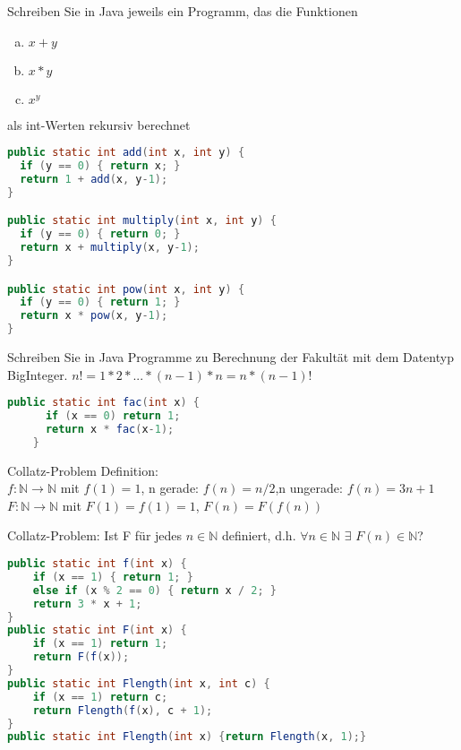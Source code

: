 \begin{card}
	Schreiben Sie in Java jeweils ein Programm, das die Funktionen
	\begin{enumerate}[a)]
	\item $x+y$
	\item $x*y$
	\item $x^y$
	\end{enumerate}
	als int-Werten rekursiv berechnet
	\hr
	\begin{lstlisting}[language=Java]
public static int add(int x, int y) {
  if (y == 0) { return x; }
  return 1 + add(x, y-1);
}

public static int multiply(int x, int y) {
  if (y == 0) { return 0; }
  return x + multiply(x, y-1);
}

public static int pow(int x, int y) {
  if (y == 0) { return 1; }
  return x * pow(x, y-1);
}
	\end{lstlisting}
\end{card}

\begin{card}
	Schreiben Sie in Java Programme zu Berechnung der Fakultät mit dem Datentyp BigInteger.
	\hr
	$n! = 1*2*...*(n-1)*n = n * (n-1)!$
	\begin{lstlisting}[language=Java]
	public static int fac(int x) {
	  if (x == 0) return 1;
	  return x * fac(x-1);
	}
	\end{lstlisting}
\end{card}

\begin{card}
	Collatz-Problem Definition:\\
	$f: \mathbb{N} \rightarrow \mathbb{N}$ mit 
	$f(1) = 1$, n gerade: $f(n) = n / 2$,n ungerade: $f(n) = 3n + 1$\\
	$F: \mathbb{N} \rightarrow \mathbb{N}$ mit $F(1) = f(1)  = 1$, $F(n) = F(f(n))$
	
	Collatz-Problem: Ist F für jedes $n \in \mathbb{N}$  definiert, d.h. $\forall n \in \mathbb{N}$ $\exists$ $F(n) \in \mathbb{N}$?
	\hr
	\begin{lstlisting}[language=Java]
public static int f(int x) { 
    if (x == 1) { return 1; } 
    else if (x % 2 == 0) { return x / 2; }
    return 3 * x + 1;
} 
public static int F(int x) { 
    if (x == 1) return 1; 
    return F(f(x)); 
}
public static int Flength(int x, int c) { 
    if (x == 1) return c; 
    return Flength(f(x), c + 1); 
}
public static int Flength(int x) {return Flength(x, 1);}
	\end{lstlisting}
\end{card}

